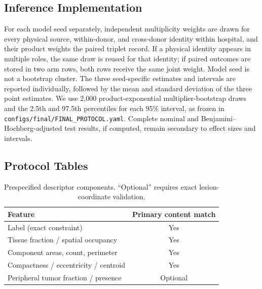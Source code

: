 \documentclass[notspecified,article,submit,moreauthors]{Definitions/mdpi}
\begin{document}
\subsection{Inference Implementation}

For each model seed separately, independent multiplicity weights are drawn
for every physical source, within-donor, and cross-donor identity within
hospital, and their product weights the paired triplet record. If a physical
identity appears in multiple roles, the same draw is reused for that
identity; if paired outcomes are stored in two arm rows, both rows receive
the same joint weight. Model seed is not a bootstrap cluster. The three
seed-specific estimates and intervals are reported individually, followed
by the mean and standard deviation of the three point estimates. We use 2,000
product-exponential multiplier-bootstrap draws and the 2.5th and 97.5th
percentiles for each 95\% interval, as frozen in
\texttt{configs/final/FINAL\_PROTOCOL.yaml}.
Complete nominal and Benjamini--Hochberg-adjusted test results, if computed,
remain secondary to effect sizes and intervals.

\subsection{Protocol Tables}

\begin{table}[H]
\caption{Prespecified descriptor components. ``Optional'' requires exact
lesion-coordinate validation.}
\label{tab:feature_membership}
\centering
\scriptsize
\setlength{\tabcolsep}{2.3pt}
\begin{tabularx}{\columnwidth}{@{}Xc@{}}
\toprule
Feature & Primary content match \\
\midrule
Label (exact constraint) & Yes \\
Tissue fraction / spatial occupancy & Yes \\
Component areas, count, perimeter & Yes \\
Compactness / eccentricity / centroid & Yes \\
Peripheral tumor fraction / presence & Optional \\
\bottomrule
\end{tabularx}
\end{table}
\end{document}
